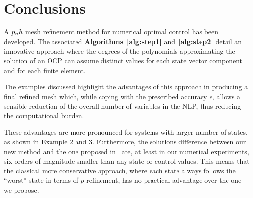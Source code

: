 \section*{Conclusions}
A $p_{n}h$ mesh refinement method for numerical optimal control has been developed. The associated {\bf Algorithms~\ref{alg:step1}} and~{\bf \ref{alg:step2}} detail an innovative approach where the degrees of the polynomials approximating the solution of an OCP can assume distinct values for each state vector component and for each finite element.

The examples discussed highlight the advantages of this approach in producing a final refined mesh which, while coping with the prescribed accuracy $\epsilon$, allows a sensible reduction of the overall number of variables in the NLP, thus reducing the computational burden.

These advantages are more pronounced for systems with larger number of states, as shown in Example 2 and 3.
Furthermore, the solutions difference between our new method and the one proposed in~\cite{Patterson:OCAM:2015} are, at least in our numerical experiments, six orders of magnitude smaller than any state or control values. This means that the classical more conservative approach, where each state always follows the ``worst'' state in terms of $p$-refinement, has no practical advantage over the one we propose.
